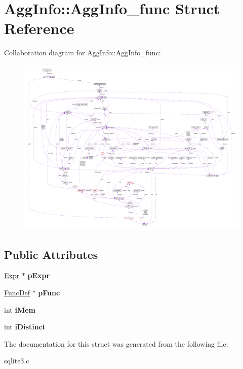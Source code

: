 \hypertarget{structAggInfo_1_1AggInfo__func}{}\section{Agg\+Info\+:\+:Agg\+Info\+\_\+func Struct Reference}
\label{structAggInfo_1_1AggInfo__func}


Collaboration diagram for Agg\+Info\+:\+:Agg\+Info\+\_\+func\+:\nopagebreak
\begin{figure}[H]
\begin{center}
\leavevmode
\includegraphics[width=350pt]{structAggInfo_1_1AggInfo__func__coll__graph}
\end{center}
\end{figure}
\subsection*{Public Attributes}
\begin{DoxyCompactItemize}
\item 
\hyperlink{structExpr}{Expr} $\ast$ {\bfseries p\+Expr}\hypertarget{structAggInfo_1_1AggInfo__func_a7b92e1c42e60d44e28ebf695316f4018}{}\label{structAggInfo_1_1AggInfo__func_a7b92e1c42e60d44e28ebf695316f4018}

\item 
\hyperlink{structFuncDef}{Func\+Def} $\ast$ {\bfseries p\+Func}\hypertarget{structAggInfo_1_1AggInfo__func_a840478e8ec53cefa57b50228f6fdafe4}{}\label{structAggInfo_1_1AggInfo__func_a840478e8ec53cefa57b50228f6fdafe4}

\item 
int {\bfseries i\+Mem}\hypertarget{structAggInfo_1_1AggInfo__func_a41a8da36555c37fffc65f1acead49a4f}{}\label{structAggInfo_1_1AggInfo__func_a41a8da36555c37fffc65f1acead49a4f}

\item 
int {\bfseries i\+Distinct}\hypertarget{structAggInfo_1_1AggInfo__func_a4a82635b0116eb44ec8ca9e47cc509d9}{}\label{structAggInfo_1_1AggInfo__func_a4a82635b0116eb44ec8ca9e47cc509d9}

\end{DoxyCompactItemize}


The documentation for this struct was generated from the following file\+:\begin{DoxyCompactItemize}
\item 
sqlite3.\+c\end{DoxyCompactItemize}
